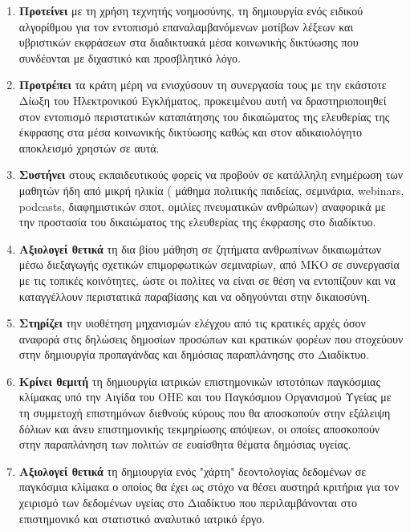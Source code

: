 \documentclass[12pt, letterpaper]{article}
\begin{document}
\begin{enumerate}
  
  \item \textbf{Προτείνει} με τη χρήση τεχνητής νοημοσύνης, τη δημιουργία ενός ειδικού αλγορίθμου για τον εντοπισμό επαναλαμβανόμενων μοτίβων λέξεων και υβριστικών εκφράσεων στα διαδικτυακά μέσα κοινωνικής δικτύωσης που συνδέονται με διχαστικό και προσβλητικό λόγο.
  
  \item \textbf{Προτρέπει} τα κράτη μέρη να ενισχύσουν τη συνεργασία τους με την εκάστοτε Δίωξη του Ηλεκτρονικού Εγκλήματος, προκειμένου αυτή να δραστηριοποιηθεί στον εντοπισμό περιστατικών καταπάτησης του δικαιώματος της ελευθερίας της έκφρασης στα μέσα κοινωνικής δικτύωσης καθώς και στον αδικαιολόγητο αποκλεισμό χρηστών σε αυτά.
  
  \item \textbf{Συστήνει} στους εκπαιδευτικούς φορείς να προβούν σε κατάλληλη ενημέρωση των μαθητών ήδη από μικρή ηλικία ( μάθημα πολιτικής παιδείας, σεμινάρια, webinars, podcasts, διαφημιστικών σποτ, ομιλίες πνευματικών ανθρώπων) αναφορικά με την προστασία του δικαιώματος της ελευθερίας της έκφρασης στο διαδίκτυο.
  
  \item \textbf{Αξιολογεί θετικά} τη δια βίου μάθηση σε ζητήματα ανθρωπίνων δικαιωμάτων μέσω διεξαγωγής σχετικών επιμορφωτικών σεμιναρίων, από ΜΚΟ σε συνεργασία με τις τοπικές κοινότητες, ώστε οι πολίτες να είναι σε θέση να εντοπίζουν και να καταγγέλλουν περιστατικά παραβίασης και να οδηγούνται στην δικαιοσύνη.
  
  \item \textbf{Στηρίζει} την υιοθέτηση μηχανισμών ελέγχου από τις κρατικές αρχές όσον αναφορά στις δηλώσεις δημοσίων προσώπων και κρατικών φορέων που στοχεύουν στην δημιουργία προπαγάνδας και δημόσιας παραπλάνησης στο Διαδίκτυο.
  
  \item \textbf{Κρίνει θεμιτή} τη δημιουργία ιατρικών επιστημονικών ιστοτόπων παγκόσμιας κλίμακας υπό την Αιγίδα του ΟΗΕ και του Παγκόσμιου Οργανισμού Υγείας με τη συμμετοχή επιστημόνων διεθνούς κύρους που θα αποσκοπούν στην εξάλειψη δόλιων και άνευ επιστημονικής τεκμηρίωσης απόψεων, οι οποίες αποσκοπούν στην παραπλάνηση των πολιτών σε ευαίσθητα θέματα δημόσιας υγείας.
  
  \item \textbf{Αξιολογεί θετικά} τη δημιουργία ενός "χάρτη" δεοντολογίας δεδομένων σε παγκόσμια κλίμακα ο οποίος θα έχει ως στόχο να θέσει αυστηρά κριτήρια για τον χειρισμό των δεδομένων υγείας στο Διαδίκτυο που περιλαμβάνονται στο επιστημονικό και στατιστικό αναλυτικό ιατρικό έργο.
  

\end{enumerate}
\end{document}

